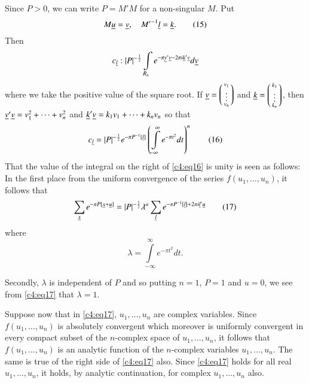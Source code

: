 Since $P>0$, we can write $P=M'M$ for a non-singular $M$. Put
\begin{equation*}
M\underline{u}=\underline{v},\quad {M'}^{-1}\underline{l}=\underline{k}.\tag{15}\label{c4:eq15}
\end{equation*}
Then 
$$
c_{\underline{l}}:|P|^{-\frac{1}{2}}\int\limits_{R_{n}}e^{-\pi
  \underline{y}'\underline{v}-2\pi i\underline{k}'\underline{v}}d\underline{v} 
$$
where we take the positive value of the square root. If
$\underline{v}=\left(\begin{smallmatrix} v_{1}\\ \vdots\\ v_{n}
\end{smallmatrix}\right)$ and
$\underline{k}=\left(\begin{smallmatrix}k_{1}\\ \vdots\\ k_{n}
\end{smallmatrix}\right)$, then
$\underline{v}'\underline{v}=v_{1}^{2}+\cdots+v_{n}^{2}$ and
$\underline{k}'\underline{v}=k_{1}v_{1}+\cdots+k_{n}v_{n}$ so that
\begin{equation*}
c_{\underline{l}}=|P|^{-\frac{1}{2}}e^{-\pi
  P^{-1}[\underline{l}]}\left(\int\limits^{\infty}_{-\infty}e^{-\pi
  t^{2}}dt\right)^{n}\tag{16}\label{c4:eq16} 
\end{equation*}
That the value of the integral on the right of \eqref{c4:eq16} is unity is
seen as follows: In the first place from the uniform convergence of
the series $f(u_{1},\ldots,u_{n})$, it follows that
\begin{equation*}
\sum_{\underline{x}}e^{-\pi
  P[\underline{x}+\underline{u}]}=|P|^{-\frac{1}{2}}\lambda^{n}\sum_{\underline{l}}e^{-\pi
  P^{-1}[\underline{l}]+2\pi i\underline{l}'\underline{u}}\tag{17}\label{c4:eq17} 
\end{equation*}
where\pageoriginale
$$
\lambda=\int\limits^{\infty}_{-\infty}e^{-\pi t^{2}}dt.
$$

Secondly, $\lambda$ is independent of $P$ and so putting $n=1$, $P=1$
and $u=0$, we see from \eqref{c4:eq17} that $\lambda=1$.

Suppose now that in \eqref{c4:eq17}, $u_{1},\ldots,u_{n}$ are complex
variables. Since $f(u_{1},\ldots,u_{n})$ is absolutely convergent
which moreover is uniformly convergent in every compact subset of the
$n$-complex space of $u_{1},\ldots,u_{n}$, it follows that
$f(u_{1},\ldots,u_{n})$ is an analytic function of the $n$-complex
variables $u_{1},\ldots,u_{n}$. The same is true of the right side of
\eqref{c4:eq17} also. Since \eqref{c4:eq17} holds for all real
$u_{1},\ldots,u_{n}$, it holds, by analytic continuation, for complex
$u_{1},\ldots,u_{n}$ also.

